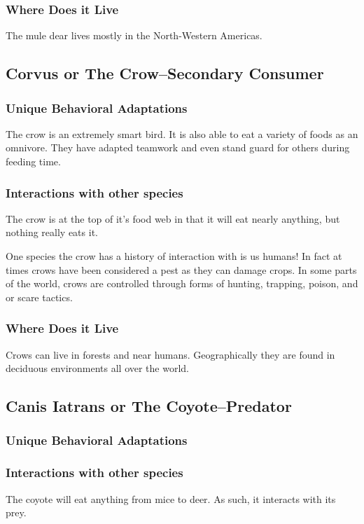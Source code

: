 \documentclass[paper=a4, fontsize=11pt]{article}
\begin{document}
\subsubsection{Where Does it Live}
The mule dear lives mostly in the North-Western Americas.

\subsection{Corvus or The Crow--Secondary Consumer}
\subsubsection{Unique Behavioral Adaptations}
The crow is an extremely smart bird. It is also able to eat a variety of foods as an omnivore. 
They have adapted teamwork and even stand guard for others during feeding time.

\subsubsection{Interactions with other species}
The crow is at the top of it's food web in that it will eat nearly anything, but nothing really eats it.

One species the crow has a history of interaction with is us humans! In fact at times crows have been considered a pest as they
can damage crops. In some parts of the world, crows are controlled through forms of hunting, trapping, poison, and or scare tactics.


\subsubsection{Where Does it Live}
Crows can live in forests and near humans. Geographically they are found in deciduous environments all over the world.


\subsection{Canis Iatrans or The Coyote--Predator}
\subsubsection{Unique Behavioral Adaptations}


\subsubsection{Interactions with other species}
The coyote will eat anything from mice to deer. As such, it interacts with its prey. 
\end{document}
